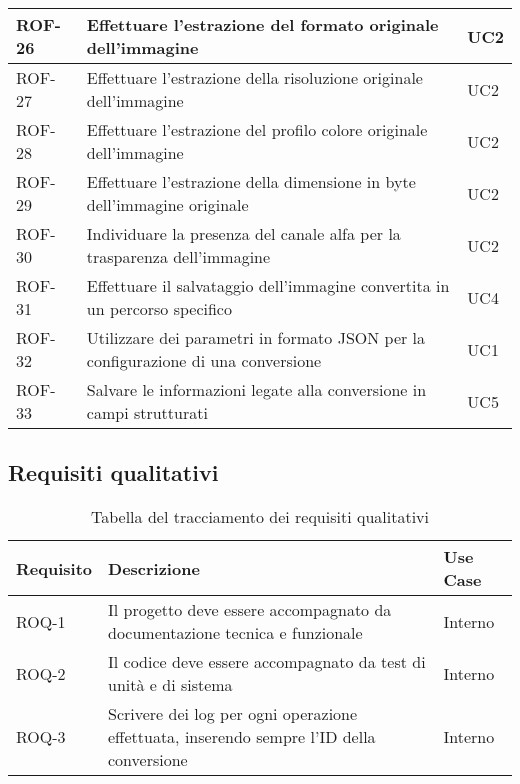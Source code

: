\begin{table}[H]
\begin{tabularx}{\textwidth}{lXl}
        \\
        \hline
        ROF-26             & Effettuare l'estrazione del formato originale dell'immagine
                           & UC2
        \\
        \hline
        ROF-27             & Effettuare l'estrazione della risoluzione originale dell'immagine
                           & UC2
        \\
        \hline
        ROF-28             & Effettuare l'estrazione del profilo colore originale dell'immagine
                           & UC2
        \\
        \hline
        ROF-29             & Effettuare l'estrazione della dimensione in byte
        dell'immagine originale
                           & UC2
        \\
        \hline
        ROF-30             & Individuare la presenza del canale alfa per la
        trasparenza dell'immagine
                           & UC2
        \\
        \hline
        ROF-31             & Effettuare il salvataggio dell'immagine convertita
        in un percorso specifico
                           & UC4
        \\
        \hline
        ROF-32             & Utilizzare dei parametri in formato JSON per la
        configurazione di una conversione
                           & UC1
        \\
        \hline
        ROF-33             & Salvare le informazioni legate alla conversione in
        campi strutturati  & UC5
        \\
        \hline
    \end{tabularx}
\end{table}%
\subsection{Requisiti qualitativi}
\begin{table}[H]
    \caption{Tabella del tracciamento dei requisiti qualitativi}
    \label{tab:requisiti-qualitativi}
    \begin{tabularx}{\textwidth}{lXl}
        \hline\hline
        \textbf{Requisito}                  & \textbf{Descrizione}                    & \textbf{Use Case} \\
        \hline
        ROQ-1                               & Il progetto deve essere accompagnato da
        documentazione tecnica e funzionale & Interno                                                     \\
        \hline
        ROQ-2                               & Il codice deve essere accompagnato
        da test di unità e di sistema       & Interno
        \\
        \hline
        ROQ-3                               & Scrivere dei log per ogni
        operazione effettuata, inserendo sempre l'ID della conversione
                                            & Interno
        \\
        \hline
    \end{tabularx}
\end{table}

